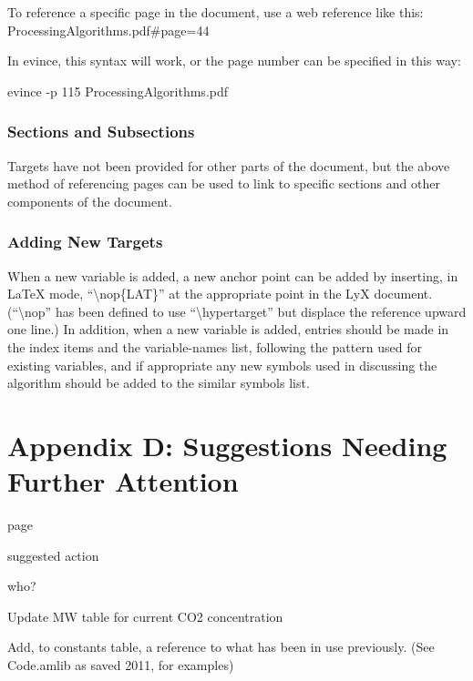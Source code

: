 \documentclass[
  english,
]{book}
\begin{document}
To reference a specific page in the document, use a web reference like this:
ProcessingAlgorithms.pdf\#page=44

In evince, this syntax will work, or the page number can be specified in this way:

evince -p 115 ProcessingAlgorithms.pdf

\hypertarget{sections-and-subsections}{%
\subsection*{Sections and Subsections}\label{sections-and-subsections}}

Targets have not been provided for other parts of the document, but the above method of referencing pages can be used to link to specific sections and other components of the document.

\hypertarget{adding-new-targets}{%
\subsection{Adding New Targets}\label{adding-new-targets}}

When a new variable is added, a new anchor point can be added by inserting, in LaTeX mode, ``\textbackslash nop\{LAT\}'' at the appropriate point in the LyX document. (``\textbackslash nop'' has been defined to use ``\textbackslash hypertarget'' but displace the reference upward one line.) In addition, when a new variable is added, entries should be made in the index items and the variable-names list, following the pattern used for existing variables, and if appropriate any new symbols used in discussing the algorithm should be added to the similar symbols list.

\hypertarget{appendix-d-suggestions-needing-further-attention}{%
\chapter*{Appendix D: Suggestions Needing Further Attention}\label{appendix-d-suggestions-needing-further-attention}}

page

suggested action

who?

Update MW table for current CO2 concentration

Add, to constants table, a reference to what has been in use previously. (See Code.amlib as saved 2011, for examples)
\end{document}
